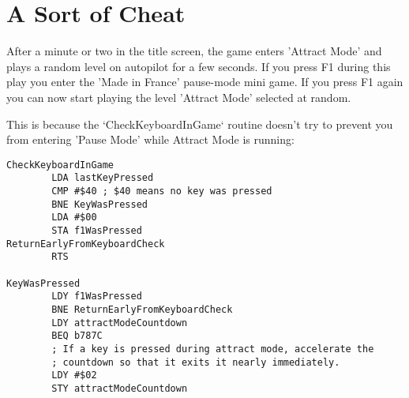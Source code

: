 \section{A Sort of Cheat}

After a minute or two in the title screen, the game enters 'Attract Mode' and
plays a random level on autopilot for a few seconds. If you press F1 during
this play you enter the 'Made in France' pause-mode mini game. If you press F1
again you can now start playing the level 'Attract Mode' selected at random.

This is because the `CheckKeyboardInGame` routine doesn't try to prevent you
from entering 'Pause Mode' while Attract Mode is running:

\begin{lstlisting}[caption=Fixing the reappearing enemy bug]
CheckKeyboardInGame
        LDA lastKeyPressed
        CMP #$40 ; $40 means no key was pressed
        BNE KeyWasPressed
        LDA #$00
        STA f1WasPressed
ReturnEarlyFromKeyboardCheck   
        RTS

KeyWasPressed   
        LDY f1WasPressed
        BNE ReturnEarlyFromKeyboardCheck
        LDY attractModeCountdown
        BEQ b787C
        ; If a key is pressed during attract mode, accelerate the
        ; countdown so that it exits it nearly immediately.
        LDY #$02
        STY attractModeCountdown
\end{lstlisting}

